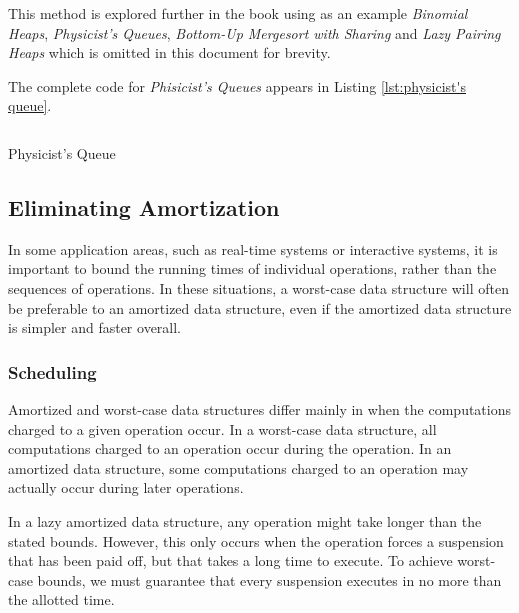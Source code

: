 \documentclass[12pt, a4paper]{article} %
\begin{document}
This method is explored further in the book using as an example \textit{Binomial Heaps}, \textit{Physicist's Queues}, \textit{Bottom-Up Mergesort with Sharing} and \textit{Lazy Pairing Heaps} which is omitted in this document for brevity.

The complete code for \textit{Phisicist's Queues} appears in Listing \ref{lst:physicist's queue}.

\begin{listing}[H]
  \inputminted[breaklines=true]{haskell}{../../Chapter6/PhysicistQueue.hs}
  \caption{Physicist's Queue}
  \label{lst:physicist's queue}
\end{listing}













\subsection{Eliminating Amortization}%
\label{sub:Eliminating Amortization}

In some application areas, such as real-time systems or interactive systems, it is important to bound the running times of individual operations, rather than the sequences of operations. In these situations, a worst-case data structure will often be preferable to an amortized data structure, even if the amortized data structure is simpler and faster overall.

\subsubsection{Scheduling}%
\label{ssub:Scheduling}

Amortized and worst-case data structures differ mainly in when the computations charged to a given operation occur. In a worst-case data structure, all computations charged to an operation occur during the operation. In an amortized data structure, some computations charged to an operation may actually occur during later operations.

In a lazy amortized data structure, any operation might take longer than the stated bounds. However, this only occurs when the operation forces a suspension that has been paid off, but that takes a long time to execute. To achieve worst-case bounds, we must guarantee that every suspension executes in no more than the allotted time.
\end{document}
